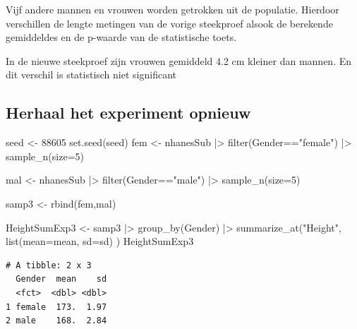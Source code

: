 \documentclass[
  dutch,
  letterpaper,
  12pt]{book}
\newenvironment{Shaded}{\begin{snugshade}}{\end{snugshade}}
\newcommand{\AttributeTok}[1]{\textcolor[rgb]{0.40,0.45,0.13}{#1}}
\newcommand{\DecValTok}[1]{\textcolor[rgb]{0.68,0.00,0.00}{#1}}
\newcommand{\FunctionTok}[1]{\textcolor[rgb]{0.28,0.35,0.67}{#1}}
\newcommand{\NormalTok}[1]{\textcolor[rgb]{0.00,0.23,0.31}{#1}}
\newcommand{\OtherTok}[1]{\textcolor[rgb]{0.00,0.23,0.31}{#1}}
\newcommand{\SpecialCharTok}[1]{\textcolor[rgb]{0.37,0.37,0.37}{#1}}
\newcommand{\StringTok}[1]{\textcolor[rgb]{0.13,0.47,0.30}{#1}}
\theoremstyle{definition}
\theoremstyle{definition}
\theoremstyle{definition}
\theoremstyle{remark}
\begin{document}
Vijf andere mannen en vrouwen worden getrokken uit de populatie.
Hierdoor verschillen de lengte metingen van de vorige steekproef alsook
de berekende gemiddeldes en de p-waarde van de statistische toets.

In de nieuwe steekproef zijn vrouwen gemiddeld 4.2 cm kleiner dan
mannen. En dit verschil is statistisch niet significant

\subsection{Herhaal het experiment
opnieuw}\label{herhaal-het-experiment-opnieuw}

\begin{Shaded}
\begin{Highlighting}[]
\NormalTok{seed }\OtherTok{\textless{}{-}} \DecValTok{88605}
\FunctionTok{set.seed}\NormalTok{(seed)}
\NormalTok{fem }\OtherTok{\textless{}{-}}\NormalTok{ nhanesSub }\SpecialCharTok{|\textgreater{}}
  \FunctionTok{filter}\NormalTok{(Gender}\SpecialCharTok{==}\StringTok{"female"}\NormalTok{) }\SpecialCharTok{|\textgreater{}}
  \FunctionTok{sample\_n}\NormalTok{(}\AttributeTok{size=}\DecValTok{5}\NormalTok{)}

\NormalTok{mal }\OtherTok{\textless{}{-}}\NormalTok{ nhanesSub }\SpecialCharTok{|\textgreater{}}
  \FunctionTok{filter}\NormalTok{(Gender}\SpecialCharTok{==}\StringTok{"male"}\NormalTok{) }\SpecialCharTok{|\textgreater{}}
  \FunctionTok{sample\_n}\NormalTok{(}\AttributeTok{size=}\DecValTok{5}\NormalTok{)}

\NormalTok{samp3 }\OtherTok{\textless{}{-}} \FunctionTok{rbind}\NormalTok{(fem,mal)}

\NormalTok{HeightSumExp3 }\OtherTok{\textless{}{-}}\NormalTok{ samp3 }\SpecialCharTok{|\textgreater{}}
  \FunctionTok{group\_by}\NormalTok{(Gender) }\SpecialCharTok{|\textgreater{}}
  \FunctionTok{summarize\_at}\NormalTok{(}\StringTok{"Height"}\NormalTok{,}
               \FunctionTok{list}\NormalTok{(}\AttributeTok{mean=}\NormalTok{mean,}
                    \AttributeTok{sd=}\NormalTok{sd)}
\NormalTok{              )}
\NormalTok{HeightSumExp3}
\end{Highlighting}
\end{Shaded}

\begin{verbatim}
# A tibble: 2 x 3
  Gender  mean    sd
  <fct>  <dbl> <dbl>
1 female  173.  1.97
2 male    168.  2.84
\end{verbatim}
\end{document}
